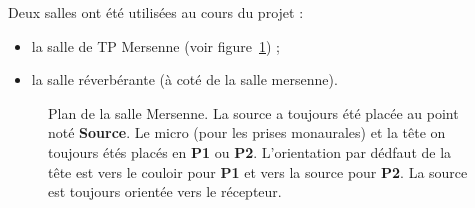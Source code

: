 Deux salles ont été utilisées au cours du projet :

\begin{itemize}
    \item la salle de TP Mersenne (voir figure~\ref{plan_mersenne}) ;
    \item la salle réverbérante (à coté de la salle mersenne).
\end{itemize}

\begin{figure}[h!]
    \caption{\label{plan_mersenne}Plan de la salle Mersenne. La source a toujours été placée au point noté
    \textbf{Source}. Le micro (pour les prises monaurales) et la tête on toujours étés placés en \textbf{P1} ou
    \textbf{P2}. L'orientation par dédfaut de la tête est vers le couloir pour \textbf{P1} et vers la source pour
    \textbf{P2}. La source est toujours orientée vers le récepteur.}
\end{figure}
